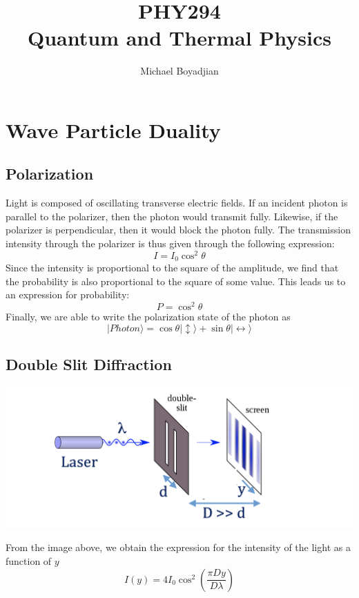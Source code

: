\documentclass[11pt]{article}
\begin{document}
\title{PHY294 \\ Quantum and Thermal Physics}
\author{Michael Boyadjian}
\maketitle
\pagebreak

\tableofcontents

\pagebreak

\bigskip
\bigskip
\bigskip

\section{Wave Particle Duality}

\subsection{Polarization}
Light is composed of oscillating transverse electric fields.  If an incident photon is parallel to the polarizer, then the photon would transmit fully. Likewise, if the polarizer is perpendicular, then it would block the photon fully. The transmission intensity through the polarizer is thus given through the following expression:
$$ I = I_0 \cos ^2 \theta $$
Since the intensity is proportional to the square of the amplitude, we find that the probability is also proportional to the square of some value. This leads us to an expression for probability:
$$P = \cos ^2 \theta $$
Finally, we are able to write the polarization state of the photon as 
$$ | Photon \rangle = \cos\theta | \updownarrow	 \rangle + \sin \theta | \leftrightarrow \rangle  $$

\subsection{Double Slit Diffraction}
\begin{center}
\includegraphics[scale=0.3]{diffraction}
\end{center}
From the image above, we obtain the expression for the intensity of the light as a function of $y$
$$ I(y) = 4 I_0 \cos ^2 \left( \frac{\pi Dy}{D\lambda }\right)$$
\end{document}
